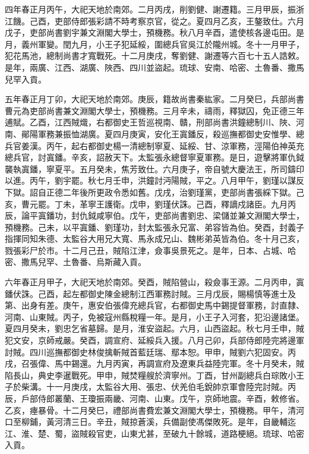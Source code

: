 \begin{pinyinscope}
四年春正月丙午，大祀天地於南郊。二月丙戌，削劉健、謝遷籍。三月甲辰，振浙江饑。己酉，吏部侍郎張彩請不時考察京官，從之。夏四月乙亥，王鏊致仕。六月戊子，吏部尚書劉宇兼文淵閣大學士，預機務。秋八月辛酉，遣使核各邊屯田。是月，義州軍變。閏九月，小王子犯延綏，圍總兵官吳江於隴州城。冬十一月甲子，犯花馬池，總制尚書才寬戰死。十二月庚戌，奪劉健、謝遷等六百七十五人誥敕。是年，兩廣、江西、湖廣、陜西、四川並盜起。琉球、安南、哈密、土魯番、撒馬兒罕入貢。

五年春正月丁卯，大祀天地於南郊。庚辰，籍故尚書秦紘家。二月癸巳，兵部尚書曹元為吏部尚書兼文淵閣大學士，預機務。三月辛未，禱雨，釋獄囚，免正德三年逋賦。乙酉，江西賊熾，右都御史王哲巡視南、贛，刑部尚書洪鐘總制川、陜、河南、鄖陽軍務兼振恤湖廣。夏四月庚寅，安化王寘鐇反，殺巡撫都御史安惟學、總兵官姜漢。丙午，起右都御史楊一清總制寧夏、延綏、甘、涼軍務，涇陽伯神英充總兵官，討寘鐇。辛亥，詔赦天下。太監張永總督寧夏軍務。是日，遊擊將軍仇鉞襲執寘鐇，寧夏平。五月癸未，焦芳致仕。六月庚子，帝自號大慶法王，所司鑄印以進。丙午，劉宇罷。秋七月壬申，洪鐘討沔陽賊，平之。八月甲午，劉瑾以謀反下獄。詔自正德二年後所更政令悉如舊。戊戌，治劉瑾黨，吏部尚書張綵下獄。己亥，曹元罷。丁未，革寧王護衛。戊申，劉瑾伏誅。己酉，釋謫戍諸臣。九月丙辰，論平寘鐇功，封仇鉞咸寧伯。戊午，吏部尚書劉忠、梁儲並兼文淵閣大學士，預機務。己未，以平寘鐇、劉瑾功，封太監張永兄富、弟容皆為伯。癸酉，封義子指揮同知朱德、太監谷大用兄大寬、馬永成兄山、魏彬弟英皆為伯。冬十月己亥，戮張彩尸於市。十二月己丑，賊陷江津，僉事吳景死之。是年，日本、占城、哈密、撒馬兒罕、土魯番、烏斯藏入貢。

六年春正月甲子，大祀天地於南郊。癸酉，賊陷營山，殺僉事王源。二月丙申，寘鐇伏誅。己酉，起左都御史陳金總制江西軍務討賊。三月戊辰，賜楊慎等進士及第、出身有差。庚午，惠安伯張偉充總兵官，右都御史馬中錫提督軍務，討直隸、河南、山東賊。丙子，免被寇州縣稅糧一年。是月，小王子入河套，犯沿邊諸堡。夏四月癸未，劉忠乞省墓歸。是月，淮安盜起。六月，山西盜起。秋七月壬申，賊犯文安，京師戒嚴。癸酉，調宣府、延綏兵入援。八月己卯，兵部侍郎陸完將邊軍討賊。四川巡撫都御史林俊擒斬賊首藍廷瑞、鄢本恕。甲申，賊劉六犯固安。丙戌，召張偉、馬中錫還。九月丙寅，再調宣府及遼東兵益陸完軍。冬十月癸未，賊陷長山，典史李暹戰死。甲申，賊焚糧艘於濟寧州。丁酉，甘州副總兵白琮敗小王子於柴溝。十一月庚戌，太監谷大用、張忠、伏羌伯毛銳帥京軍會陸完討賊。丙辰，戶部侍郎叢蘭、王瓊振兩畿、河南、山東。戊午，京師地震。辛酉，敕修省。乙亥，瘞暴骨。十二月癸巳，禮部尚書費宏兼文淵閣大學士，預機務。甲午，清河口至柳鋪，黃河清三日。辛丑，賊掠蒼溪，兵備副使馮傑敗死。是年，自畿輔迄江、淮、楚、蜀，盜賊殺官吏，山東尤甚，至破九十餘城，道路梗絕。琉球、哈密入貢。


\end{pinyinscope}
